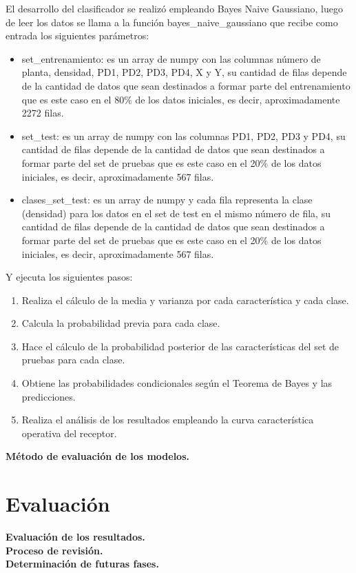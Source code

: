 El desarrollo del clasificador se realizó empleando Bayes Naive Gaussiano, luego de leer los datos se llama a la función bayes\_naive\_gaussiano que recibe como entrada los siguientes parámetros:
\begin{itemize}
	\item{set\_entrenamiento: es un array de numpy con las columnas número de planta, densidad, PD1, PD2, PD3, PD4, X y Y, su cantidad de filas depende de la cantidad de datos que sean destinados a formar parte del entrenamiento que es este caso en el 80\% de los datos iniciales, es decir, aproximadamente 2272 filas.}
	\item{set\_test: es un array de numpy con las columnas PD1, PD2, PD3 y PD4, su cantidad de filas depende de la cantidad de datos que sean destinados a formar parte del set de pruebas que es este caso en el 20\% de los datos iniciales, es decir, aproximadamente 567 filas.}
	\item{clases\_set\_test: es un array de numpy y cada fila representa la clase (densidad) para los datos en el set de test en el mismo número de fila, su cantidad de filas depende de la cantidad de datos que sean destinados a formar parte del set de pruebas que es este caso en el 20\% de los datos iniciales, es decir, aproximadamente 567 filas.}
\end{itemize}

Y ejecuta los siguientes pasos:
\begin{enumerate}
	\item {Realiza el cálculo de la media y varianza por cada característica y cada clase.}
	\item {Calcula la probabilidad previa para cada clase.}
	\item {Hace el cálculo de la probabilidad posterior de las características del set de pruebas para cada clase.}
	\item {Obtiene las probabilidades condicionales según el Teorema de Bayes y las predicciones.}
	\item {Realiza el análisis de los resultados empleando la curva característica operativa del receptor.}
\end{enumerate}

\noindent
\textbf{Método de evaluación de los modelos.}\\

\section{Evaluación}

\noindent
\textbf{Evaluación de los resultados.}\\

\noindent
\textbf{Proceso de revisión.}\\

\noindent
\textbf{Determinación de futuras fases.}\\